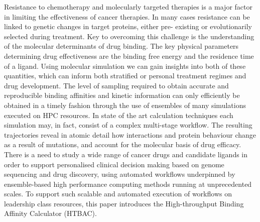 Resistance to chemotherapy and molecularly targeted therapies is a major
factor in limiting the effectiveness of cancer therapies. In many cases
resistance can be linked to genetic changes in target proteins, either pre-
existing or evolutionarily selected during treatment. Key to overcoming this
challenge is the understanding of the molecular determinants of drug binding.
The key physical parameters determining drug effectiveness are the binding
free energy and the residence time of a ligand. Using molecular simulation we
can gain insights into both of these quantities, which can inform both
stratified or personal treatment regimes and drug development. The level of
sampling required to obtain accurate and reproducible binding affinities and
kinetic information can only efficiently be obtained in a timely fashion
through the use of ensembles of many simulations executed on HPC resources. In
state of the art calculation techniques each simulation may, in fact, consist
of a complex multi-stage workflow. The resulting trajectories reveal in atomic
detail how interactions and protein behaviour change as a result of mutations,
and account for the molecular basis of drug efficacy. There is a need to study
a wide range of cancer drugs and candidate ligands in order to support
personalised clinical decision making based on genome sequencing and drug
discovery, using automated workflows underpinned by ensemble-based high
performance computing methods running at unprecedented scales. To support such
scalable and automated execution of workflows on leadership class resources,
this paper introduces the High-throughput Binding Affinity Calculator (HTBAC).





